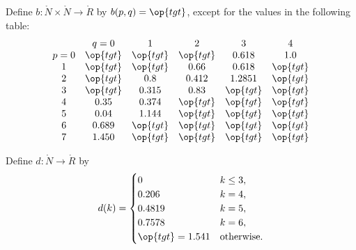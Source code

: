 \begin{definition}[b]
Define $b:\ring{N}\times \ring{N}\to \ring{R}$ by $b(p,q)=\op{tgt}$,
except for the values in the following table:
{
\def\tx{\op{tgt}}
\[ \begin{matrix}  &q=0&1&2&3&4\\
p=0&\tx&\tx&\tx&0.618&1.0\\
1&\tx&\tx&0.66&0.618&\tx\\
2&\tx&0.8&0.412&1.2851&\tx\\
3&\tx&0.315&0.83&\tx&\tx\\
4&0.35&0.374&\tx&\tx&\tx\\
5&0.04&1.144&\tx&\tx&\tx\\
6&0.689&\tx&\tx&\tx&\tx\\
7&1.450&\tx&\tx&\tx&\tx
\end{matrix}
\] 
}
%
\end{definition}


\begin{definition}[d]
Define $d:\ring{N}\to \ring{R}$ by
\[ d(k) = \begin{cases}
0 & k\le3, \\
0.206 & k=4, \\
0.4819 & k=5, \\
0.7578 & k=6, \\
\op{tgt}=1.541 & \text{otherwise}.
\end{cases}
\] 
%
\end{definition}




